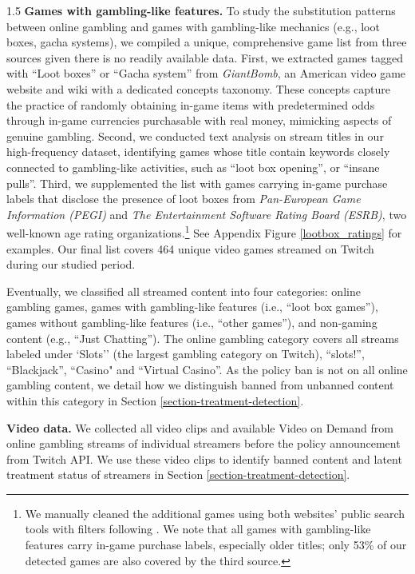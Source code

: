 \documentclass[a4paper,12pt]{article}
\begin{document}
\begin{spacing}{1.5}
\noindent \textbf{Games with gambling-like features.} To study the substitution patterns between online gambling and games with gambling-like mechanics (e.g., loot boxes, gacha systems), we compiled a unique, comprehensive game list from three sources given there is no readily available data. First, 
we extracted games tagged with “Loot boxes” or “Gacha system” from \textit{GiantBomb}, an American video game website and wiki with a dedicated concepts taxonomy. These concepts capture the practice of randomly obtaining in-game items with predetermined odds through in-game currencies purchasable with real money, mimicking aspects of genuine gambling. Second, we 
conducted text analysis on stream titles in our high-frequency dataset, identifying games whose title contain keywords closely connected to gambling-like activities, such as “loot box opening”, or “insane pulls”. Third, we supplemented the list with games carrying in-game purchase labels that disclose the presence of loot boxes from \textit{Pan-European Game Information (PEGI)} and \textit{The Entertainment Software Rating Board (ESRB)}, two well-known age rating organizations.\footnote{We manually cleaned the additional games using both websites' public search tools with filters following \cite{xiao2023beneath}. We note that all games with gambling-like features carry in-game purchase labels, especially older titles; only 53\% of our detected games are also covered by the third source.} See Appendix Figure \ref{lootbox_ratings} for examples. Our final list covers 464 unique video games streamed on Twitch during our studied period. 

Eventually, we classified all streamed content into four categories: online gambling games, games with gambling-like features (i.e., ``loot box games''), games without         
gambling-like features (i.e., ``other games''), and non-gaming content (e.g., ``Just Chatting''). The online gambling category covers all streams labeled under `Slots'' (the largest gambling category on Twitch), ``slots!'', ``Blackjack'', ``Casino" and ``Virtual Casino''. As the policy ban is not on all online gambling content, we detail how we distinguish banned from unbanned content within this category in Section \ref{section-treatment-detection}.

\noindent \textbf{Video data.} We collected all video clips and available Video on Demand from online gambling streams of individual streamers before the policy announcement from Twitch API. We use these video clips to identify banned content and latent treatment status of streamers in Section \ref{section-treatment-detection}.


\end{spacing}
\end{document}
